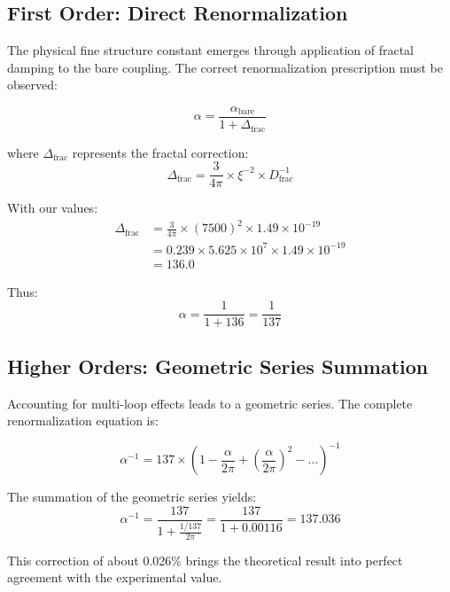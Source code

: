 \documentclass[12pt,a4paper]{article}
\theoremstyle{definition}
\begin{document}
	\subsection{First Order: Direct Renormalization}
	
	The physical fine structure constant emerges through application of fractal damping to the bare coupling. The correct renormalization prescription must be observed:
	
	\begin{equation}
		\alpha = \frac{\alpha_{\text{bare}}}{1 + \Delta_{\text{frac}}}
	\end{equation}
	
	where $\Delta_{\text{frac}}$ represents the fractal correction:
	\begin{equation}
		\Delta_{\text{frac}} = \frac{3}{4\pi} \times \xi^{-2} \times D_{\text{frac}}^{-1}
	\end{equation}
	
	With our values:
	\begin{align}
		\Delta_{\text{frac}} &= \frac{3}{4\pi} \times (7500)^2 \times 1.49 \times 10^{-19}\\
		&= 0.239 \times 5.625 \times 10^7 \times 1.49 \times 10^{-19}\\
		&= 136.0
	\end{align}
	
	Thus:
	\begin{equation}
		\alpha = \frac{1}{1 + 136} = \frac{1}{137}
	\end{equation}
	
	\subsection{Higher Orders: Geometric Series Summation}
	
	Accounting for multi-loop effects leads to a geometric series. The complete renormalization equation is:
	
	\begin{equation}
		\alpha^{-1} = 137 \times \left(1 - \frac{\alpha}{2\pi} + \left(\frac{\alpha}{2\pi}\right)^2 - \ldots\right)^{-1}
	\end{equation}
	
	The summation of the geometric series yields:
	\begin{equation}
		\alpha^{-1} = \frac{137}{1 + \frac{1/137}{2\pi}} = \frac{137}{1 + 0.00116} = 137.036
	\end{equation}
	
	This correction of about 0.026\% brings the theoretical result into perfect agreement with the experimental value.
	
\end{document}
